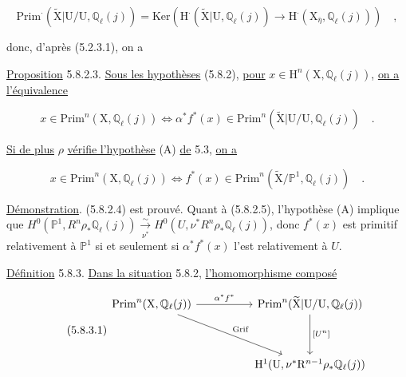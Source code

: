 \begin{equation}\tag{5.8.2.2}
\mathrm{Prim}^{\cdot}(\widetilde{\mathrm{X}}|\mathrm{U}/\mathrm{U},\mathbb{Q}_\ell(j)) = \mathrm{Ker}(\mathrm{H}^{\cdot}(\widetilde{\mathrm{X}}|\mathrm{U},\mathbb{Q}_\ell(j)) \longrightarrow \mathrm{H}^{\cdot}(\mathrm{X}_{\overline{\eta}},\mathbb{Q}_\ell(j))) \quad ,
\end{equation}

donc, d'après (5.2.3.1), on a

\underline{Proposition} 5.8.2.3. \underline{Sous les hypothèses} (5.8.2), \underline{pour} $x \in \mathrm{H}^n(\mathrm{X},\mathbb{Q}_\ell(j))$, \underline{on a l'équivalence}

\begin{equation}\tag{5.8.2.4}
x \in \mathrm{Prim}^n(\mathrm{X},\mathbb{Q}_\ell(j)) \Longleftrightarrow \alpha^*f^*(x) \in \mathrm{Prim}^n(\widetilde{\mathrm{X}}|\mathrm{U}/\mathrm{U},\mathbb{Q}_\ell(j)) \quad .
\end{equation}

\underline{Si de plus} $\rho$ \underline{vérifie l'hypothèse} (A) \underline{de} 5.3, \underline{on a}

\begin{equation}\tag{5.8.2.5}
x \in \mathrm{Prim}^n(\mathrm{X},\mathbb{Q}_\ell(j)) \Longleftrightarrow f^*(x) \in \mathrm{Prim}^n(\widetilde{\mathrm{X}}/ \mathbb{P}^1,\mathbb{Q}_\ell(j)) \quad .
\end{equation}

\underline{Démonstration}. (5.8.2.4) est prouvé. Quant à (5.8.2.5), l'hypothèse (A) implique que $H^0(\mathbb{P}^1,R^n\rho_*\mathbb{Q}_\ell(j)) \xrightarrow[\nu^*]{\sim} H^0(U,\nu^*R^n\rho_*\mathbb{Q}_\ell(j))$, donc $f^*(x)$ est primitif relativement à $\mathbb{P}^1$ si et seulement si $\alpha^*f^*(x)$ l'est relativement à $U$.

\underline{Définition} 5.8.3. \underline{Dans la situation} 5.8.2, \underline{l'homomorphisme composé}

\begin{equation}\tag{5.8.3.1}
\begin{tikzcd}[column sep=huge, row sep=huge]
\mathrm{Prim}^n(\mathrm{X},\mathbb{Q}_\ell(j)) \arrow[r, "\alpha^*f^*"] \arrow[dr, "\mathrm{Grif}"] & \mathrm{Prim}^n(\widetilde{\mathrm{X}}|\mathrm{U}/\mathrm{U},\mathbb{Q}_\ell(j)) \arrow[d, "{[U^n]}"] \\
{} & \mathrm{H}^1(\mathrm{U},\nu^*\mathrm{R}^{n-1}\rho_*\mathbb{Q}_\ell(j))
\end{tikzcd}
\end{equation}

